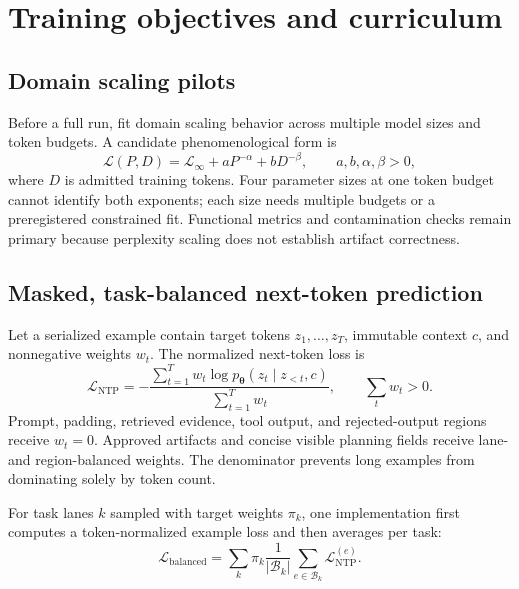 \documentclass[10pt,letterpaper]{article}
\newcommand{\1}{\mathbb{1}}
\newcommand{\vect}[1]{\bm{#1}}
\begin{document}
\section{Training objectives and curriculum}

\subsection{Domain scaling pilots}

Before a full run, fit domain scaling behavior across multiple model sizes and token budgets.  A
candidate phenomenological form is
\begin{equation}
  \mathcal L(P,D)=\mathcal L_\infty+aP^{-\alpha}+bD^{-\beta},
  \qquad a,b,\alpha,\beta>0,
  \label{eq:scaling-law}
\end{equation}
where $D$ is admitted training tokens.  Four parameter sizes at one token budget cannot identify
both exponents; each size needs multiple budgets or a preregistered constrained fit.  Functional
metrics and contamination checks remain primary because perplexity scaling does not establish
artifact correctness.

\subsection{Masked, task-balanced next-token prediction}

Let a serialized example contain target tokens $z_1,\ldots,z_T$, immutable context $c$, and
nonnegative weights $w_t$.  The normalized next-token loss is
\begin{equation}
  \mathcal L_{\mathrm{NTP}}
  =-\frac{\sum_{t=1}^{T}w_t
      \log p_{\vect\theta}(z_t\mid z_{<t},c)}
     {\sum_{t=1}^{T}w_t},
  \qquad \sum_tw_t>0.
  \label{eq:ntp}
\end{equation}
Prompt, padding, retrieved evidence, tool output, and rejected-output regions receive $w_t=0$.
Approved artifacts and concise visible planning fields receive lane- and region-balanced weights.
The denominator prevents long examples from dominating solely by token count.

For task lanes $k$ sampled with target weights $\pi_k$, one implementation first computes a
token-normalized example loss and then averages per task:
\begin{equation}
  \mathcal L_{\mathrm{balanced}}
  =\sum_k\pi_k\frac{1}{|\mathcal B_k|}
     \sum_{e\in\mathcal B_k}\mathcal L_{\mathrm{NTP}}^{(e)}.
  \label{eq:task-balanced-loss}
\end{equation}
\end{document}
